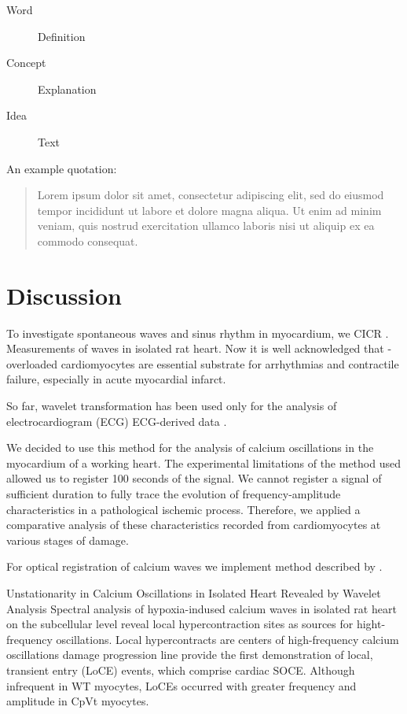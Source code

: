\documentclass{biophys-new}
\begin{document}
\begin{description}
\item[Word] Definition
\item[Concept] Explanation
\item[Idea] Text
\end{description}

An example quotation:

\begin{quote}
Lorem ipsum dolor sit amet, consectetur adipiscing elit, sed do eiusmod tempor incididunt ut labore et dolore magna aliqua. Ut enim ad minim veniam, quis nostrud exercitation ullamco laboris nisi ut aliquip ex ea commodo consequat.
\end{quote}


\section*{Discussion}

To investigate spontaneous  waves and sinus rhythm in myocardium, we
CICR .
Measurements of  waves in isolated rat heart.
Now it is well acknowledged that  - overloaded cardiomyocytes are essential substrate for arrhythmias and contractile failure, especially in acute myocardial infarct.

So far, wavelet transformation has been used only for the analysis of electrocardiogram (ECG) ECG-derived data \cite{sharma2017use}.

We decided to use this method for the analysis of calcium oscillations in the myocardium of a working heart.
The experimental limitations of the method used allowed us to register 100 seconds of the signal.
We cannot register a signal of sufficient duration to fully trace the evolution of frequency-amplitude characteristics in a pathological ischemic process.
Therefore, we applied a comparative analysis of these characteristics recorded from cardiomyocytes at various stages of damage.

For optical registration of calcium waves we implement method described by \cite{matsuura2018intravital}.

Unstationarity in Calcium Oscillations in Isolated Heart Revealed by Wavelet Analysis
Spectral analysis of hypoxia-indused calcium waves in isolated rat heart on the subcellular level reveal local hypercontraction sites as sources for hight-frequency oscillations.
Local hypercontracts are centers of high-frequency calcium oscillations
damage progression line
\cite{bonilla2019enhancement} provide the first demonstration of local, transient  entry
(LoCE) events, which comprise cardiac SOCE. Although infrequent in WT myocytes, LoCEs occurred
with greater frequency and amplitude in CpVt myocytes.
\end{document}
